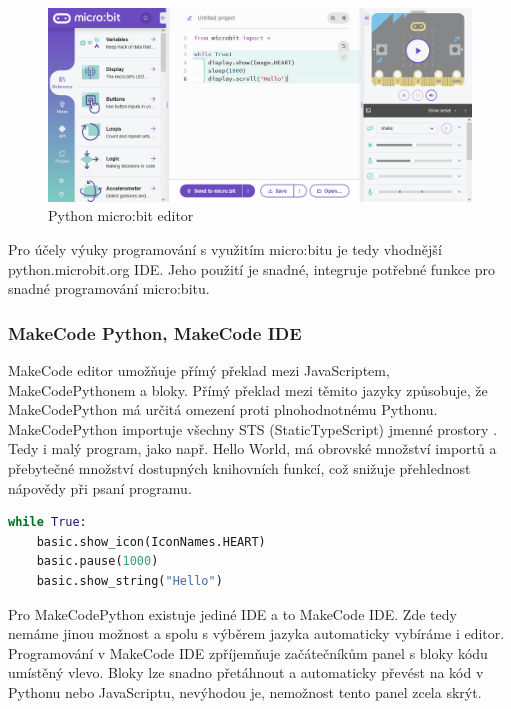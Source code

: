 \documentclass[
  digital,     %
  oneside,     %
  nosansbold,  %
  colorbold, %
  lof,         %
  nolot,         %
]{fithesis4}
\begin{document}
\begin{figure}
    \centering
    \includegraphics[width=\textwidth]  {images/pythonMBE.png}
    \caption{Python micro:bit editor}
    \label{MicroBitED}
\end{figure}

Pro účely výuky programování s využitím micro:bitu je tedy vhodnější python.microbit.org IDE. Jeho použití je snadné, integruje potřebné funkce pro snadné programování micro:bitu.

\subsubsection{MakeCode Python, MakeCode IDE}

MakeCode editor umožňuje přímý překlad mezi JavaScriptem, MakeCodePythonem a bloky. Přímý překlad mezi těmito jazyky způsobuje, že MakeCodePython má určitá omezení proti plnohodnotnému Pythonu. MakeCodePython importuje všechny STS (StaticTypeScript) jmen\-né prostory \cite{makeCodePython}. Tedy i malý program, jako např. Hello World, má obrovské množství importů a přebytečné množství dostupných knihovních funkcí, což snižuje přehlednost nápovědy při psaní programu.

\begin{lstlisting}[language=Python, caption=MakeCode Python ukázka]
while True:
    basic.show_icon(IconNames.HEART)
    basic.pause(1000)
    basic.show_string("Hello")
\end{lstlisting}

Pro MakeCodePython existuje jediné IDE a to MakeCode IDE. Zde tedy nemáme jinou možnost a spolu s výběrem jazyka automaticky vybíráme i editor. Programování v MakeCode IDE zpříjemňuje začátečníkům panel s bloky kódu umístěný vlevo. Bloky lze snadno přetáhnout a automaticky převést na kód v Pythonu nebo JavaScriptu, nevýhodou je, nemožnost tento panel zcela skrýt.
\end{document}
